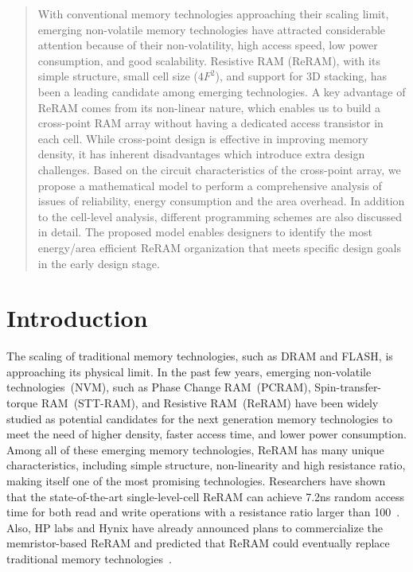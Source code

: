 \begin{abstract}
With conventional memory technologies approaching their scaling limit,
emerging non-volatile memory technologies have attracted considerable
attention because of their non-volatility, high access speed, low power
consumption, and good scalability. Resistive RAM (ReRAM), with its simple
structure, small cell size ($4F^2$), and support for 3D stacking, has been
a leading candidate among emerging technologies. A key advantage of ReRAM
comes from its non-linear nature, which enables us to build a cross-point
RAM array without having a dedicated access transistor in each cell. While
cross-point design is effective in improving memory density, it has
inherent disadvantages which introduce extra design challenges. Based on
the circuit characteristics of the cross-point array, we propose a
mathematical model to perform a comprehensive analysis of issues of
reliability, energy consumption and the area overhead. In addition to the
cell-level analysis, different programming schemes are also discussed in
detail. The proposed model enables designers to identify the most
energy/area efficient ReRAM organization that meets specific design goals in the early design stage.

\end{abstract}

\section{Introduction}\label{sec:intro}
The scaling of traditional memory technologies, such as DRAM and FLASH, is
approaching its physical limit. In the past few years, emerging
non-volatile technologies~(NVM), such as Phase Change RAM~(PCRAM),
Spin-transfer-torque RAM~(STT-RAM), and Resistive RAM~(ReRAM) have been widely
studied as potential candidates for the next generation memory
technologies to meet the need of higher density, faster access time, and
lower power consumption. Among all of these emerging memory technologies,
ReRAM has many unique characteristics, including simple structure,
non-linearity and high resistance ratio, making itself one of the most
promising technologies. Researchers have shown that the state-of-the-art
single-level-cell ReRAM can achieve 7.2ns random access time for both
read and write operations with a resistance ratio larger than
100~\cite{ReRAM_ISSCC2011_Sheu}. Also, HP labs and Hynix have already
announced plans to commercialize the memristor-based ReRAM and predicted
that ReRAM could eventually replace traditional memory
technologies~\cite{memristor:HpHynix}.

